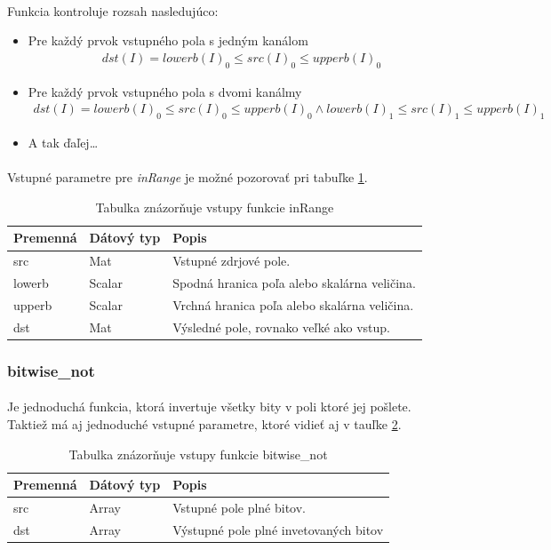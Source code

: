 \documentclass[12pt]{article}
\begin{document}
\paragraph{}
Funkcia kontroluje rozsah nasledujúco:
\begin{itemize}
  \item Pre každý prvok vstupného pola s jedným kanálom
	\begin{align*}
	dst(I) = lowerb(I)_0 \le src(I)_0 \le upperb(I)_0
	\end{align*}
  \item Pre každý prvok vstupného pola s dvomi kanálmy
  	\begin{align*}
	dst(I) = lowerb(I)_0 \le src(I)_0 \le upperb(I)_0 \wedge lowerb(I)_1 \le src(I)_1 \le upperb(I)_1
	\end{align*}
  \item A tak ďaľej\ldots
\end{itemize}
\paragraph{}
Vstupné parametre pre \emph{inRange} je možné pozorovať pri tabuľke \ref{inRangePar}. 
\cite{inrange_doc}
\cite{OpenCVDoc}
\begin{table}
	\centering
    \begin{tabular}{ | l | l | p{5cm} |}
    \hline
    Premenná & Dátový typ & Popis \\ \hline
    src & Mat & Vstupné zdrjové pole. \\ \hline
    lowerb & Scalar & Spodná hranica poľa alebo skalárna veličina. \\ \hline
    upperb & Scalar & Vrchná hranica poľa alebo skalárna veličina. \\ \hline
    dst & Mat & Výsledné pole, rovnako veľké ako vstup. \\
    \hline
    \end{tabular}
  	\caption{Tabulka znázorňuje vstupy funkcie inRange}
  	\label{inRangePar}
\end{table}
\subsubsection{bitwise\_not}
\paragraph{}
Je jednoduchá funkcia, ktorá invertuje všetky bity v poli ktoré jej pošlete. Taktiež má aj jednoduché vstupné parametre, ktoré vidieť aj v tauľke \ref{bitwisePar}.
\cite{bitwise_not_doc}
\cite{OpenCVDoc}
\begin{table}
	\centering
    \begin{tabular}{ | l | l | p{5cm} |}
    \hline
    Premenná & Dátový typ & Popis \\ \hline
    src & Array & Vstupné pole plné bitov. \\ \hline
    dst & Array & Výstupné pole plné invetovaných bitov \\
    \hline
    \end{tabular}
  	\caption{Tabulka znázorňuje vstupy funkcie bitwise\_not}
  	\label{bitwisePar}
\end{table}
\end{document}
